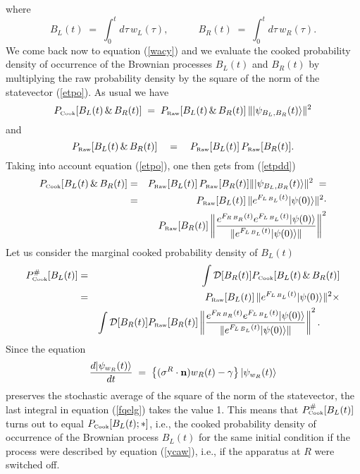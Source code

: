 \documentclass[12pt]{article}
\begin{document}
where
\begin{equation}
B_{L}(t) \; = \; \int_{0}^{t}d\tau\, w_{L}(\tau), \qquad\quad
B_{R}(t) \; = \; \int_{0}^{t}d\tau\, w_{R}(\tau).
\end{equation}
We come back now to equation (\ref{wacy}) and we evaluate the
cooked probability density of occurrence of the Brownian processes
$B_{L}(t)$ and $B_{R}(t)$ by multiplying the raw probability
density by the square of the norm of the statevector (\ref{etpo}).
As usual we have
\begin{equation} \label{etpdd}
P_{\makebox{\tiny Cook}}[B_{L}(t)\,\&\, B_{R}(t)] \; = \;
P_{\makebox{\tiny Raw}}[B_{L}(t)\,\&\, B_{R}(t)]\, \|
|\psi_{B_{L}, B_{R}}(t)\rangle \|^{2}
\end{equation}
and
\begin{equation}
P_{\makebox{\tiny Raw}}[B_{L}(t)\,\&\, B_{R}(t)] \quad = \quad
P_{\makebox{\tiny Raw}}[B_{L}(t)]\, P_{\makebox{\tiny
Raw}}[B_{R}(t)].
\end{equation}
Taking into account equation (\ref{etpo}), one then gets from
(\ref{etpdd})
\begin{eqnarray}
P_{\makebox{\tiny Cook}}[B_{L}(t)\,\&\, B_{R}(t)] & = &
P_{\makebox{\tiny Raw}}[B_{L}(t)]\, P_{\makebox{\tiny
Raw}}[B_{R}(t)] \| |\psi_{B_{L}, B_{R}}(t)\rangle \|^{2} \; =
\nonumber \\ & = & P_{\makebox{\tiny Raw}}[B_{L}(t)]\, \|
e^{F_{L\, B_{L}}(t)}|\psi(0)\rangle \|^{2} \cdot \nonumber \\ & &
P_{\makebox{\tiny Raw}}[B_{R}(t)] \left\| \frac{ e^{F_{R\,
B_{R}}(t)} e^{F_{L\, B_{L}}(t)} |\psi(0)\rangle}{\| e^{F_{L\,
B_{L}}(t)}|\psi(0)\rangle\|} \right\|^{2}
\end{eqnarray}
Let us consider the marginal cooked probability density of
$B_{L}(t)$
\begin{eqnarray} \label{fqelg}
P^{\#}_{\makebox{\tiny Cook}}[B_{L}(t)] & = & \int {\mathcal
D}[B_{R}(t)]
P_{\makebox{\tiny Cook}}[B_{L}(t)\,\&\, B_{R}(t)] \nonumber \\
& = & P_{\makebox{\tiny Raw}}[B_{L}(t)]\, \| e^{F_{L\,
B_{L}}(t)}|\psi(0)\rangle \|^{2} \times \nonumber \\ & & \int
{\mathcal D}[B_{R}(t)] P_{\makebox{\tiny Raw}}[B_{R}(t)] \left\|
\frac{ e^{F_{R\, B_{R}}(t)} e^{F_{L\, B_{L}}(t)}
|\psi(0)\rangle}{\| e^{F_{L\, B_{L}}(t)}|\psi(0)\rangle\|}
\right\|^{2}. \qquad
\end{eqnarray}
Since the equation
\begin{equation}
\frac{d|\psi_{w_{R}}(t)\rangle}{dt} \; = \; \left\{ ({\bf
\sigma}^{R}\cdot {\bf n})w_{R}(t) - \gamma  \right\}
|\psi_{w_{R}}(t)\rangle
\end{equation}
preserves the stochastic average of the square of the norm of the
statevector, the last integral in equation (\ref{fqelg}) takes the
value 1. This means that $P^{\#}_{\makebox{\tiny Cook}}[B_{L}(t)]$
turns out to equal $P_{\makebox{\tiny Cook}}[B_{L}(t); *]$, i.e.,
the cooked probability density of occurrence of the Brownian
process $B_{L}(t)$ for the same initial condition if the process
were described by equation (\ref{ycaw}), i.e., if the apparatus at
$R$ were switched off.
\end{document}
